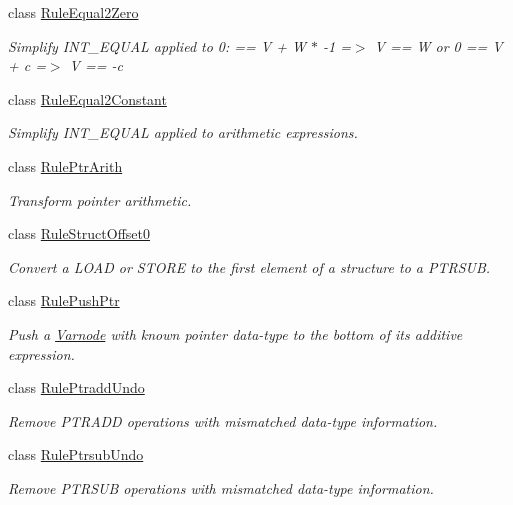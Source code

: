 \begin{DoxyCompactItemize}
class \mbox{\hyperlink{class_rule_equal2_zero}{Rule\+Equal2\+Zero}}
\begin{DoxyCompactList}\small\item\em Simplify I\+N\+T\+\_\+\+E\+Q\+U\+AL applied to 0\+: { == V + W $\ast$ -\/1 =$>$ V == W or 0 == V + c =$>$ V == -\/c} \end{DoxyCompactList}\item 
class \mbox{\hyperlink{class_rule_equal2_constant}{Rule\+Equal2\+Constant}}
\begin{DoxyCompactList}\small\item\em Simplify I\+N\+T\+\_\+\+E\+Q\+U\+AL applied to arithmetic expressions. \end{DoxyCompactList}\item 
class \mbox{\hyperlink{class_rule_ptr_arith}{Rule\+Ptr\+Arith}}
\begin{DoxyCompactList}\small\item\em Transform pointer arithmetic. \end{DoxyCompactList}\item 
class \mbox{\hyperlink{class_rule_struct_offset0}{Rule\+Struct\+Offset0}}
\begin{DoxyCompactList}\small\item\em Convert a L\+O\+AD or S\+T\+O\+RE to the first element of a structure to a P\+T\+R\+S\+UB. \end{DoxyCompactList}\item 
class \mbox{\hyperlink{class_rule_push_ptr}{Rule\+Push\+Ptr}}
\begin{DoxyCompactList}\small\item\em Push a \mbox{\hyperlink{class_varnode}{Varnode}} with known pointer data-\/type to the bottom of its additive expression. \end{DoxyCompactList}\item 
class \mbox{\hyperlink{class_rule_ptradd_undo}{Rule\+Ptradd\+Undo}}
\begin{DoxyCompactList}\small\item\em Remove P\+T\+R\+A\+DD operations with mismatched data-\/type information. \end{DoxyCompactList}\item 
class \mbox{\hyperlink{class_rule_ptrsub_undo}{Rule\+Ptrsub\+Undo}}
\begin{DoxyCompactList}\small\item\em Remove P\+T\+R\+S\+UB operations with mismatched data-\/type information. \end{DoxyCompactList}\item 

\end{DoxyCompactItemize}
